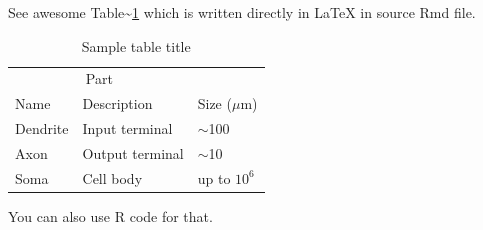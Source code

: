 \documentclass{article}
\begin{document}
See awesome Table\textasciitilde{}\ref{tab:table} which is written
directly in LaTeX in source Rmd file.

\begin{table}
 \caption{Sample table title}
  \centering
  \begin{tabular}{lll}
    \toprule
    \multicolumn{2}{c}{Part}                   \\
    \cmidrule(r){1-2}
    Name     & Description     & Size ($\mu$m) \\
    \midrule
    Dendrite & Input terminal  & $\sim$100     \\
    Axon     & Output terminal & $\sim$10      \\
    Soma     & Cell body       & up to $10^6$  \\
    \bottomrule
  \end{tabular}
  \label{tab:table}
\end{table}

You can also use R code for that.
\end{document}
